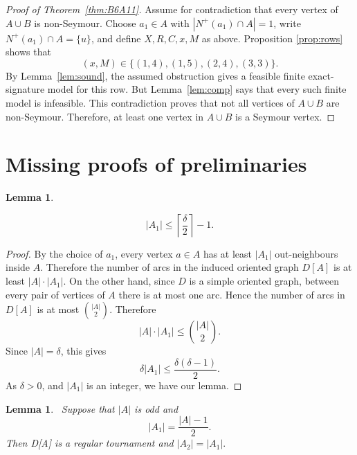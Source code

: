 \documentclass[a4paper,fleqn]{cas-sc}
\newtheorem{lemma}[theorem]{Lemma}
\theoremstyle{definition}
\begin{document}
\begin{proof}[Proof of Theorem~\ref{thm:B6A11}]
Assume for contradiction that every vertex of $A\cup B$ is non-Seymour. Choose $a_1\in A$ with $|N^+(a_1)\cap A|=1$, write $N^+(a_1)\cap A=\{u\}$, and define $X,R,C,x,M$ as above. Proposition \ref{prop:rows} shows that
\[
(x,M)\in\{(1,4),(1,5),(2,4),(3,3)\}.
\]
By Lemma~\ref{lem:sound}, the assumed obstruction gives a feasible finite exact-signature model for this row. But Lemma~\ref{lem:comp} says that every such finite model is infeasible. This contradiction proves that not all vertices of $A\cup B$ are non-Seymour. Therefore, at least one vertex in $A\cup B$ is a Seymour vertex.
\end{proof}


\appendix

\section{Missing proofs of preliminaries}\label{sec:Missing proofs in preliminaries}

\begin{lemma}\label{app:lem:general bound for A_1}

\[
|A_{1}|\leq \left\lceil \frac{\delta}{2}\right\rceil-1.
\]
\end{lemma}

\begin{proof}
By the choice of \(a_{1}\), every vertex \(a\in A\) has at least \(|A_{1}|\) out-neighbours inside \(A\). Therefore the number of arcs in the induced oriented graph \(D[A]\) is at least $|A|\cdot |A_{1}|.$
On the other hand, since \(D\) is a simple oriented graph, between every pair of vertices of \(A\) there is at most one arc. Hence the number of arcs in \(D[A]\) is at most $\binom{|A|}{2}.$
Therefore
\[
|A|\cdot |A_{1}|\leq \binom{|A|}{2}.
\]
Since \(|A|=\delta\), this gives
\[
\delta |A_{1}|\leq \frac{\delta(\delta-1)}{2}.
\]
As \(\delta>0\), and  \(|A_{1}|\) is an integer, we have our lemma.

\end{proof}


\begin{lemma}~\label{app:lem:perfectdegree}
Suppose that \(|A|\) is odd and
\[
|A_{1}|=\frac{|A|-1}{2}.
\]
Then D[A] is a regular tournament and $|A_2|=|A_{1}|.$
\end{lemma}
\end{document}

